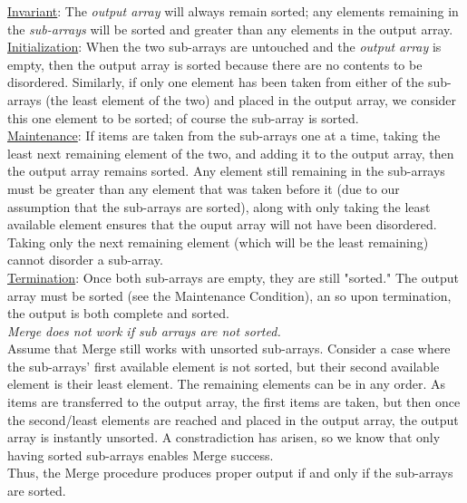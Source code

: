 \documentclass[11pts]{article}
\begin{document}
\begin{enumerate}
  \underline{Invariant}: The \emph{output array} will always remain sorted;
  any elements remaining in the \emph{sub-arrays} will be sorted and
  greater than any elements in the output array.\\

  \underline{Initialization}: When the two sub-arrays are untouched and the
  \emph{output array} is empty, then the output array is sorted because there
  are no contents to be disordered. Similarly, if only one element has been
  taken from either of the sub-arrays (the least element of the two) and
  placed in the output array, we consider this one element to be sorted; of
  course the sub-array is sorted.\\

  \underline{Maintenance}: If items are taken from the sub-arrays one at a
  time, taking the least next remaining element of the two, and adding it to the
  output array, then the output array remains sorted. Any element still
  remaining in the sub-arrays must be greater than any element that was taken
  before it (due to our assumption that the sub-arrays are sorted), along
  with only taking the least available element ensures that
  the ouput array will not have been disordered. Taking
  only the next remaining element (which will be the least remaining)
  cannot disorder a sub-array.\\

  \underline{Termination}: Once both sub-arrays are empty, they are still
  "sorted." The output array must be sorted (see the Maintenance
  Condition), an so upon termination, the output is both complete and sorted. \\

  \textit{Merge does not work if sub arrays are not sorted.}\\

  Assume that Merge still works with unsorted sub-arrays.
  Consider a case where the sub-arrays' first available element is not sorted,
  but their second available element is their least element. The remaining
  elements can be in any order. As items are transferred to the output array,
  the first items are taken, but then once the second/least elements are
  reached and placed in the output array, the output array is instantly
  unsorted. A constradiction has arisen, so we know that only having sorted
  sub-arrays enables Merge success.\\

  Thus, the Merge procedure produces proper output if and only if the
  sub-arrays are sorted.


\end{enumerate}
\end{document}
